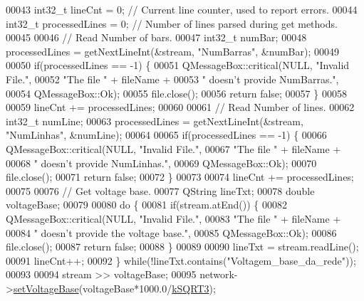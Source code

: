 \begin{DoxyCode}
00043   int32\_t lineCnt = 0; \textcolor{comment}{// Current line counter, used to report errors.}
00044   int32\_t processedLines = 0; \textcolor{comment}{// Number of lines parsed during get methods.}
00045 
00046   \textcolor{comment}{// Read Number of bars.}
00047   int32\_t numBar;
00048   processedLines = getNextLineInt(&stream, \textcolor{stringliteral}{"NumBarras"}, &numBar);
00049 
00050   \textcolor{keywordflow}{if}(processedLines == -1) \{
00051     QMessageBox::critical(NULL, \textcolor{stringliteral}{"Invalid File."},
00052                           \textcolor{stringliteral}{"The file "} + fileName +
00053                           \textcolor{stringliteral}{" doesn't provide NumBarras."},
00054                           QMessageBox::Ok);
00055     file.close();
00056     \textcolor{keywordflow}{return} \textcolor{keyword}{false};
00057   \}
00058 
00059   lineCnt += processedLines;
00060 
00061   \textcolor{comment}{// Read Number of lines.}
00062   int32\_t numLine;
00063   processedLines = getNextLineInt(&stream, \textcolor{stringliteral}{"NumLinhas"}, &numLine);
00064 
00065   \textcolor{keywordflow}{if}(processedLines == -1) \{
00066     QMessageBox::critical(NULL, \textcolor{stringliteral}{"Invalid File."},
00067                           \textcolor{stringliteral}{"The file "} + fileName +
00068                           \textcolor{stringliteral}{" doesn't provide NumLinhas."},
00069                           QMessageBox::Ok);
00070     file.close();
00071     \textcolor{keywordflow}{return} \textcolor{keyword}{false};
00072   \}
00073 
00074   lineCnt += processedLines;
00075 
00076   \textcolor{comment}{// Get voltage base.}
00077   QString lineTxt;
00078   \textcolor{keywordtype}{double} voltageBase;
00079 
00080   \textcolor{keywordflow}{do} \{
00081     \textcolor{keywordflow}{if}(stream.atEnd()) \{
00082       QMessageBox::critical(NULL, \textcolor{stringliteral}{"Invalid File."},
00083                             \textcolor{stringliteral}{"The file "} + fileName +
00084                             \textcolor{stringliteral}{" doesn't provide the voltage base."},
00085                             QMessageBox::Ok);
00086       file.close();
00087       \textcolor{keywordflow}{return} \textcolor{keyword}{false};
00088     \}
00089 
00090     lineTxt = stream.readLine();
00091     lineCnt++;
00092   \} \textcolor{keywordflow}{while}(!lineTxt.contains(\textcolor{stringliteral}{"Voltagem\_base\_da\_rede"}));
00093 
00094   stream >> voltageBase;
00095   network->\hyperlink{group___models_gac2787bb9c323716baa2e6fba06136f2b}{setVoltageBase}(voltageBase*1000.0/\hyperlink{math__constants_8h_a987f07b0b550988e3f3f9fb36d74142e}{kSQRT3});

\end{DoxyCode}
